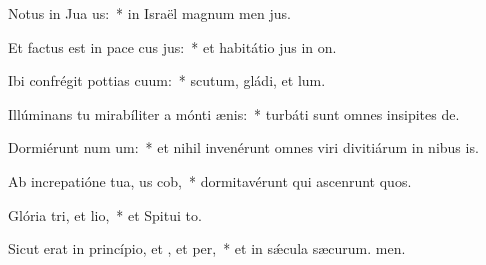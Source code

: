 \item Notus in Jua us:~* in Israël magnum men jus.
\item Et factus est in pace cus jus:~* et habitátio jus in on.
\item Ibi confrégit pottias cuum:~* scutum, gládi, et lum.
\item Illúminans tu mirabíliter a mónti ænis:~* turbáti sunt omnes insipites de.
\item Dormiérunt num um:~* et nihil invenérunt omnes viri divitiárum in nibus is.
\item Ab increpatióne tua, us cob,~* dormitavérunt qui ascenrunt quos.
\item Glória tri, et lio,~* et Spitui to.
\item Sicut erat in princípio, et , et per,~* et in sǽcula sæcurum. men.
